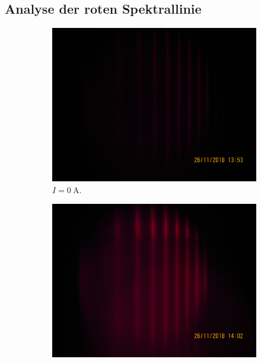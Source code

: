 \subsection{Analyse der roten Spektrallinie}
\label{sec:AuswRot}

\begin{figure}
  \centering
  \begin{subfigure}{.32\textwidth}
    \centering
    \includegraphics[width=\textwidth]{rohdaten/rot_sigma_0A.JPG}
    \caption{$I = \SI{0}{\ampere}.$}
  \end{subfigure}
  \begin{subfigure}{.32\textwidth}
    \centering
    \includegraphics[width=\textwidth]{rohdaten/rot_pi_10,5A-2.JPG}

\end{subfigure}
\end{figure}
